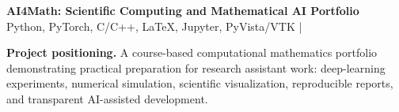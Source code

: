 \documentclass[10pt,a4paper]{article}
\begin{document}
\begin{center}
{\Large\bfseries AI4Math: Scientific Computing and Mathematical AI Portfolio}\\[2pt]
{\small Python, PyTorch, C/C++, LaTeX, Jupyter, PyVista/VTK \quad | }
\end{center}

\vspace{-4pt}
\noindent
\colorbox{soft}{%
\begin{minipage}{0.97\linewidth}
\textbf{Project positioning.}
A course-based computational mathematics portfolio demonstrating practical
preparation for research assistant work: deep-learning experiments, numerical
simulation, scientific visualization, reproducible reports, and transparent
AI-assisted development.
\end{minipage}}
\end{document}
